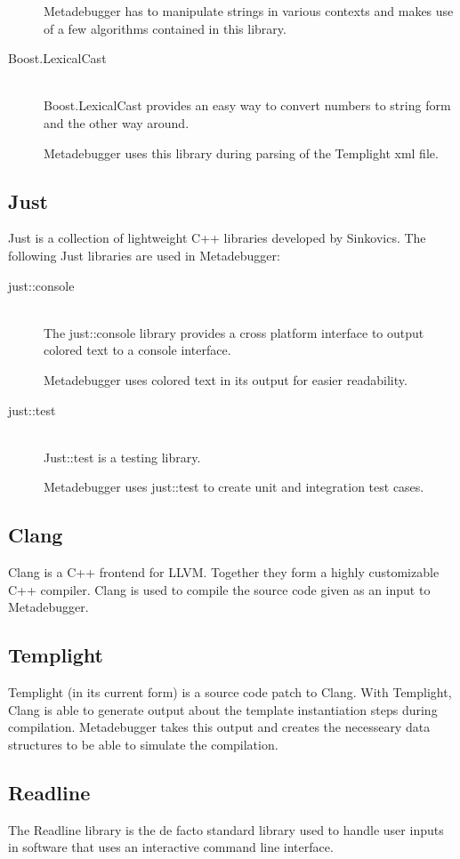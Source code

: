 \begin{description}
        Metadebugger has to manipulate strings in various contexts and makes
        use of a few algorithms contained in this library.
    \item[Boost.LexicalCast] \hfill \\
        Boost.LexicalCast provides an easy way to convert numbers to string
        form and the other way around.

        Metadebugger uses this library during parsing of the Templight xml
        file.

\end{description}

\subsection{Just\cite{just}}

Just is a collection of lightweight C++ libraries developed by Sinkovics. The
following Just libraries are used in Metadebugger:
\begin{description}
    \item[just::console] \hfill \\
        The just::console library provides a cross platform interface to output
        colored text to a console interface.

        Metadebugger uses colored text in its output for easier readability.
    \item[just::test] \hfill \\
        Just::test is a testing library.

        Metadebugger uses just::test to create unit and integration test cases.
\end{description}

\subsection{Clang\cite{clang}}

Clang is a C++ frontend for LLVM. Together they form a highly customizable C++
compiler. Clang is used to compile the source code given as an input to
Metadebugger.

\subsection{Templight\cite{templight}}

Templight (in its current form) is a source code patch to Clang. With
Templight, Clang is able to generate output about the template instantiation
steps during compilation. Metadebugger takes this output and creates the
necesseary data structures to be able to simulate the compilation.

\subsection{Readline\cite{readline}}

The Readline library is the de facto standard library used to handle user
inputs in software that uses an interactive command line interface.


